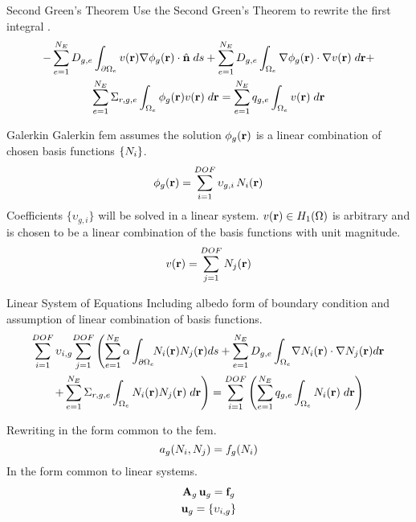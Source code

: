 \begin{frame}{Second Green's Theorem}
  Use the Second Green's Theorem to rewrite the first integral
  \cite{textbookli}.
  \begin{multline} 
    -\sum_{e=1}^{N_E} D_{g,e} \int_{\partial \Omega_e} v(\mathbf{r}) \mathbf{\nabla}
    \phi_g(\mathbf{r}) \cdot \hat{\mathbf{n}} \;ds + \sum_{e=1}^{N_E} 
      D_{g,e} \int_{\Omega_e} \mathbf{\nabla} \phi_g(\mathbf{r}) \cdot \mathbf{\nabla} v(\mathbf{r}) 
      \; d\mathbf{r} + \\
      \sum_{e=1}^{N_E} \Sigma_{r,g,e} \int_{\Omega_e} \phi_g(\mathbf{r}) v(\mathbf{r}) 
     \; d\mathbf{r} =
      \sum_{e=1}^{N_E} q_{g,e} \int_{\Omega_e} v(\mathbf{r}) \; d\mathbf{r}
  \end{multline}
\end{frame}

\begin{frame}{Galerkin }
  Galerkin \gls{fem} assumes the solution $\phi_g(\mathbf{r})$ is a linear
  combination of chosen basis functions $\{N_i\}$.
  \begin{equation} 
    \label{eq:linear_combination}
    \phi_g(\mathbf{r}) = \sum_{i=1}^{DOF} \upsilon_{g,i} \, N_i(\mathbf{r})
  \end{equation}
  Coefficients $\{\upsilon_{g,i}\}$ will be solved in a linear system.
  $v(\mathbf{r}) \in H_1(\Omega)$ is arbitrary and is chosen to be a
  linear combination of the basis functions with unit magnitude.
  \begin{equation} 
    \label{eq:linear_superposition}
    v(\mathbf{r}) = \sum_{j=1}^{DOF} N_j(\mathbf{r})
  \end{equation}
\end{frame}

\begin{frame}{Linear System of Equations}
  Including albedo form of boundary condition and assumption of 
  linear combination of basis functions.
  \begin{multline}
    \label{eq:linear_equation}
    \sum_{i=1}^{DOF} \upsilon_{i,g} \! \sum_{j=1}^{DOF} \left(
      \sum_{e=1}^{N_E} \alpha \int_{\partial \Omega_e} \! \!
      N_i(\mathbf{r})  N_j(\mathbf{r}) ds +
      \sum_{e=1}^{N_E} D_{g,e} 
      \int_{\Omega_e} \! \mathbf{\nabla} N_i(\mathbf{r}) \cdot \mathbf{\nabla} N_j(\mathbf{r}) d\mathbf{r}
    \right.
    \\
    \left.
      +
      \sum_{e=1}^{N_E} \Sigma_{r,g,e}
      \int_{\Omega_e} N_i(\mathbf{r}) N_j(\mathbf{r}) \; d\mathbf{r} \right) 
      =
      \sum_{i=1}^{DOF} \left(
      \sum_{e=1}^{N_E} q_{g,e} 
      \int_{\Omega_e} N_i(\mathbf{r}) \; d\mathbf{r} \right)
  \end{multline}

  Rewriting in the form common to the \gls{fem}.
  \begin{equation}
    \label{eq:fem_notation}
    a_g(N_i,N_j) = f_g(N_i)
  \end{equation}
  In the form common to linear systems.
  \begin{gather}
    \label{eq:matrix_notation}
    \mathbf{A}_g \, \mathbf{u}_g = \mathbf{f}_g \\
    \mathbf{u}_g = \{\upsilon_{i,g}\}
  \end{gather}
\end{frame}

